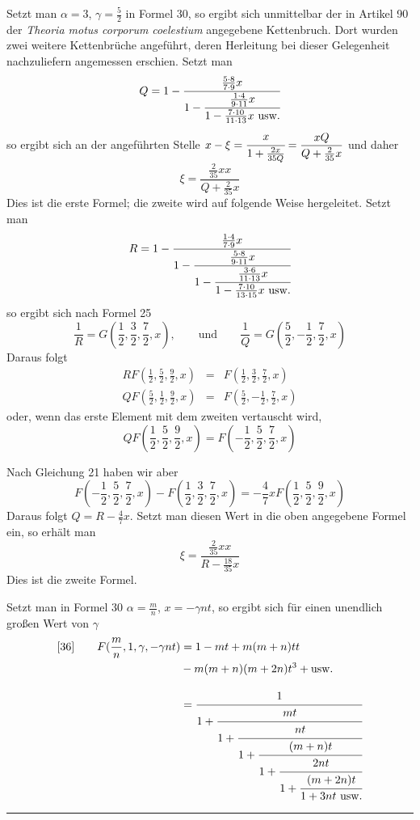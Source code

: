 Setzt man $\alpha=3$, $\gamma=\frac52$ in Formel 30, so ergibt sich unmittelbar der in Artikel 90 der \textit{Theoria motus corporum coelestium} angegebene Kettenbruch. Dort wurden zwei weitere Kettenbrüche angeführt, deren Herleitung bei dieser Gelegenheit nachzuliefern angemessen erschien. Setzt man
\[
Q=1-\cfrac{\frac{5\cdot8}{7\cdot9}x}{1-\cfrac{\frac{1\cdot4}{9\cdot11}x}{1-\frac{7\cdot10}{11\cdot13}x\ \mathrm{usw.}}}
\]
so ergibt sich an der angeführten Stelle $\displaystyle x-\xi=\cfrac{x}{1+\frac{2x}{35Q}}=\frac{xQ}{Q+\frac2{35}x}$ und daher
\[
\xi=\frac{\frac2{35}xx}{Q+\frac2{35}x}
\]
Dies ist die erste Formel; die zweite wird auf folgende Weise hergeleitet. Setzt man
\[
R=1-\cfrac{\frac{1\cdot4}{7\cdot9}x}{1-\cfrac{\frac{5\cdot8}{9\cdot11}x}{1-\cfrac{\frac{3\cdot6}{11\cdot13}x}{1-\frac{7\cdot10}{13\cdot15}x\ \mathrm{usw.}}}}
\]
so ergibt sich nach Formel 25
\[
\frac1R=G(\frac12,\frac32,\frac72,x),
\qquad\mbox{und}\qquad
\frac1Q=G(\frac52,-\frac12,\frac72,x)
\]
Daraus folgt
\[
\begin{array}{rcl}
RF(\frac12,\frac52,\frac92,x)&=&F(\frac12,\frac32,\frac72,x)\\[4pt]
QF(\frac52,\frac12,\frac92,x)&=&F(\frac52,-\frac12,\frac72,x)
\end{array}
\]
oder, wenn das erste Element mit dem zweiten vertauscht wird,
\[
QF(\frac12,\frac52,\frac92,x)=F(-\frac12,\frac52,\frac72,x)
\]
\par
Nach Gleichung 21 haben wir aber
\[
F(-\frac12,\frac52,\frac72,x)-F(\frac12,\frac32,\frac72,x)
=-\frac47xF(\frac12,\frac52,\frac92,x)
\]
Daraus folgt $Q=R-\frac47x$. Setzt man diesen Wert in die oben angegebene Formel ein, so erhält man
\[
\xi=\frac{\frac2{35}xx}{R-\frac{18}{35}x}
\]
Dies ist die zweite Formel.
\par
Setzt man in Formel 30 $\alpha=\frac mn$, $x=-\gamma nt$, so ergibt sich für einen unendlich großen Wert von $\gamma$
\[
\begin{aligned}
{}[36]\qquad F(\frac mn,1,\gamma,-\gamma nt)
&=1-mt+m(m+n)tt\\&{}-m(m+n)(m+2n)t^3+\mathrm{usw.}\\[8pt]
&=\displaystyle\cfrac{1}{1+\cfrac{mt}{1+\cfrac{nt}{1+\cfrac{(m+n)t}{1+\cfrac{2nt}{1+\cfrac{(m+2n)t}{1+3nt\ \mathrm{usw.}}}}}}}
\end{aligned}
\]
\begin{center}\rule{0.27\textwidth}{0.4pt}\end{center}

